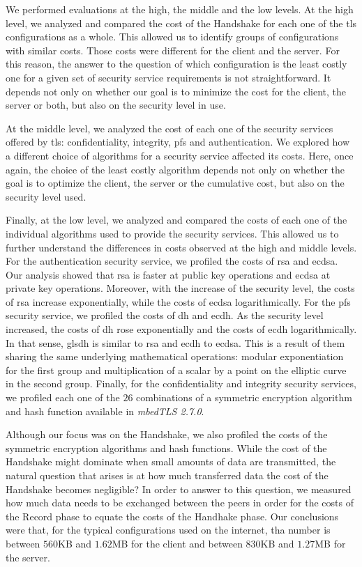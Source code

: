 We performed evaluations at the high, the middle and the low levels. At the high level, we analyzed and compared the cost of the Handshake for each 
one of the \gls{tls} configurations as a whole. This allowed us to identify groups of configurations with similar costs. Those costs were different for the client and the server. For this reason,
the answer to the question of which configuration is the least costly one for a given set of security service requirements is not straightforward. 
It depends not only on whether our goal is to minimize the cost for the client, the server or both, but also on the security level in use.

At the middle level, we analyzed the cost of each one of the security services offered by \gls{tls}: confidentiality, integrity, \gls{pfs}
and authentication. We explored how a different choice of algorithms for a security service affected its costs. Here, once again, the choice
of the least costly algorithm depends not only on whether the goal is to optimize the client, the server or the cumulative cost, but also on the
security level used.

Finally, at the low level, we analyzed and compared the costs of each one of the individual algorithms used to provide the security services. This allowed us
to further understand the differences in costs observed at the high and middle levels.
For the authentication security service, we profiled the costs of \gls{rsa} and \gls{ecdsa}. Our analysis showed that \gls{rsa} is faster at public key operations
and \gls{ecdsa} at private key operations. Moreover, with the increase of the security level, the costs of \gls{rsa} increase exponentially, while the
costs of \gls{ecdsa} logarithmically. For the \gls{pfs} security service, we profiled the costs of \gls{dh} and \gls{ecdh}. As the security level increased,
the costs of \gls{dh} rose exponentially and the costs of \gls{ecdh} logarithmically. In that sense, gls{dh} is similar
to \gls{rsa} and \gls{ecdh} to \gls{ecdsa}. This is a result of them sharing the same underlying mathematical operations: modular exponentiation for the first group and
multiplication of a scalar by a point on the elliptic curve in the second group.
Finally, for the confidentiality and integrity security services, we profiled each one of the $26$ combinations of a symmetric encryption algorithm and hash function available in \textit{mbedTLS 2.7.0}.

Although our focus was on the Handshake, we also profiled the costs of the symmetric encryption algorithms and hash functions. While the cost of the
Handshake might dominate when small amounts of data are transmitted, the natural question that arises is at how much transferred data the cost of
the Handshake becomes negligible? In order to answer to this question, we measured how much data needs to be exchanged between the peers in order for the
costs of the Record phase to equate the costs of the Handhake phase. Our conclusions were that, for the typical configurations used on the internet, 
tha number is between $560$KB and $1.62$MB for the client and between $830$KB and $1.27$MB for the server.

